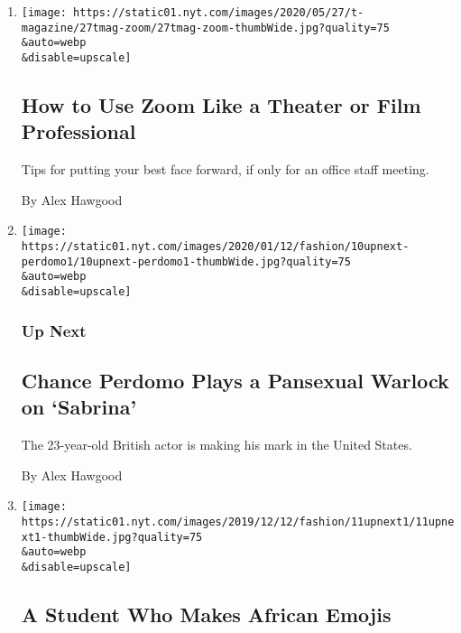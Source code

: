 \begin{enumerate}
\def\labelenumi{\arabic{enumi}.}
\item
  \href{/2020/05/27/t-magazine/zoom-tips-coronavirus.html}{}

  \texttt{[image: https://static01.nyt.com/images/2020/05/27/t-magazine/27tmag-zoom/27tmag-zoom-thumbWide.jpg?quality=75\\\&auto=webp\\\&disable=upscale]}

  \hypertarget{how-to-use-zoom-like-a-theater-or-film-professional}{%
  \subsection{How to Use Zoom Like a Theater or Film
  Professional}\label{how-to-use-zoom-like-a-theater-or-film-professional}}

  Tips for putting your best face forward, if only for an office staff
  meeting.

  By Alex Hawgood
\item
  \href{/2020/01/10/style/chance-perdomo-netflix-sabrina.html}{}

  \texttt{[image: https://static01.nyt.com/images/2020/01/12/fashion/10upnext-perdomo1/10upnext-perdomo1-thumbWide.jpg?quality=75\\\&auto=webp\\\&disable=upscale]}

  \hypertarget{up-next}{%
  \subsubsection{Up Next}\label{up-next}}

  \hypertarget{chance-perdomo-plays-a-pansexual-warlock-on-sabrina}{%
  \subsection{Chance Perdomo Plays a Pansexual Warlock on
  `Sabrina'}\label{chance-perdomo-plays-a-pansexual-warlock-on-sabrina}}

  The 23-year-old British actor is making his mark in the United States.

  By Alex Hawgood
\item
  \href{/2019/12/11/style/a-student-who-makes-african-emojis.html}{}

  \texttt{[image: https://static01.nyt.com/images/2019/12/12/fashion/11upnext1/11upnext1-thumbWide.jpg?quality=75\\\&auto=webp\\\&disable=upscale]}

  \hypertarget{a-student-who-makes-african-emojis}{%
  \subsection{A Student Who Makes African
  Emojis}\label{a-student-who-makes-african-emojis}}


\end{enumerate}
